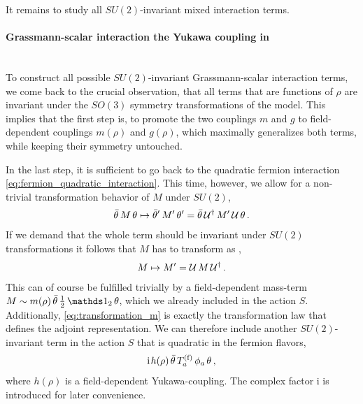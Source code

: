It remains to study all $SU(2)$-invariant mixed interaction terms.
	
\paragraph{Grassmann-scalar interaction \dash{} the Yukawa coupling in \texorpdfstring{\dzero{}}{d=0}}\label{paragraph:0dSU2modelYukawa}\mbox{}\\%
To construct all possible $SU(2)$-invariant Grassmann-scalar interaction terms, we come back to the crucial observation, that all terms that are functions of $\rho$ are invariant under the $SO(3)$ symmetry transformations of the model. 
This implies that the first step is, to promote the two couplings $m$ and $g$ to field-dependent couplings $m(\rho)$ and $g(\rho)$, which maximally generalizes both terms, while keeping their symmetry untouched.
	
In the last step, it is sufficient to go back to the quadratic fermion interaction \eqref{eq:fermion_quadratic_interaction}.
This time, however, we allow for a non-trivial transformation behavior of $M$ under $SU(2)$,
\begin{align}
	\bar{\theta} \, M \, \theta \mapsto \bar{\theta}^\prime \, M^\prime \, \theta^\prime = \bar{\theta} \, \mathcal{U}{}^{\dagger} \, M^\prime \, \mathcal{U}{} \, \theta \,.
\end{align}
If we demand that the whole term should be invariant under $SU(2)$ transformations it follows that $M$ has to transform as ,
\begin{align}
	M \mapsto M^\prime = \mathcal{U}{} \, M \, \mathcal{U}{}^{\dagger} \,.	\label{eq:transformation_m}
\end{align}
This can of course be fulfilled trivially by a field-dependent mass-term $M \sim m(\rho) \, \bar{\theta} \, \tfrac{1}{2} \, \Id_2 \, \theta$, which we already included in the action ${S}$.
Additionally, \cref{eq:transformation_m} is exactly the transformation law that defines the adjoint representation.
We can therefore include another $SU(2)$-invariant term in the action $S$ that is quadratic in the fermion flavors,
\begin{align}
	\iu\vts h(\rho) \, \bar{\theta} \, T^{(\mathrm{f})}_a \, \phi_a \, \theta \, ,
\end{align}
where $h(\rho)$ is a field-dependent Yukawa-coupling.
The complex factor $\mathrm{i}$ is introduced for later convenience.\bigskip

